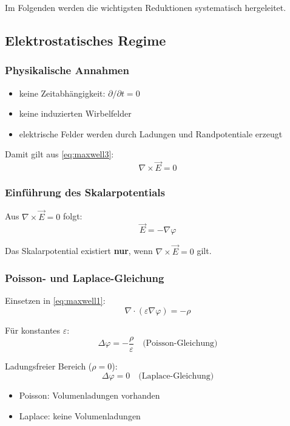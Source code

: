 \documentclass[a4paper]{article}
\newcommand{\imp}[1]{{\color{accent}\bfseries #1}}
\newcommand{\E}{\vec E}
\newcommand{\eps}{\varepsilon}
\begin{document}
Im Folgenden werden die wichtigsten Reduktionen systematisch hergeleitet.

\subsection{Elektrostatisches Regime}

\subsubsection{Physikalische Annahmen}

\begin{itemize}
  \item keine Zeitabhängigkeit: $\partial/\partial t = 0$
  \item keine induzierten Wirbelfelder
  \item elektrische Felder werden durch Ladungen und Randpotentiale erzeugt
\end{itemize}

Damit gilt aus \eqref{eq:maxwell3}:
\[
\nabla \times \E = 0
\]

\subsubsection{Einführung des Skalarpotentials}

Aus $\nabla \times \E = 0$ folgt:
\[
\E = -\nabla \varphi
\]

\begin{merke}
Das Skalarpotential existiert \imp{nur}, wenn $\nabla \times \E = 0$ gilt.
\end{merke}

\subsubsection{Poisson- und Laplace-Gleichung}

Einsetzen in \eqref{eq:maxwell1}:
\[
\nabla \cdot (\eps \nabla \varphi) = -\rho
\]

Für konstantes $\eps$:
\[
\Delta \varphi = -\frac{\rho}{\eps}
\quad \text{(Poisson-Gleichung)}
\]

Ladungsfreier Bereich ($\rho = 0$):
\[
\Delta \varphi = 0
\quad \text{(Laplace-Gleichung)}
\]

\begin{checkitem}
\begin{itemize}
  \item Poisson: Volumenladungen vorhanden
  \item Laplace: keine Volumenladungen
\end{itemize}
\end{checkitem}
\end{document}
